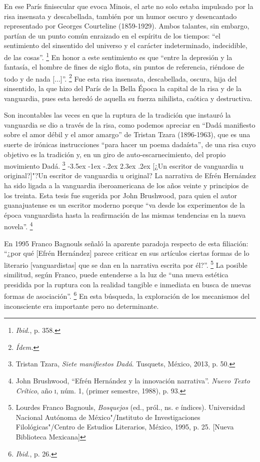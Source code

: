\documentclass[14pt,twoside,final]{extbook} %
\makeatletter
\let\oldfootnote\footnote
\renewcommand\footnote[1]{%
\oldfootnote{\hspace{1mm}#1}}
\renewcommand\section{\@startsection {section}{1}{\z@}%
                                     {-3.5ex \@plus -1ex \@minus -.2ex}%
                                     {2.3ex \@plus .2ex}%
                                     {\normalfont\large\bfseries\sc}}
\makeatother
\begin{document}
En ese París finisecular que evoca Minois, el arte no solo estaba impulsado por la risa insensata y descabellada, también por un humor oscuro y desencantado representado por Georges Courteline (1859-1929). Ambos talantes, sin embargo, partían de un punto común enraizado en el espíritu de los tiempos: ``el sentimiento del sinsentido del universo y el carácter indeterminado, indecidible, de las cosas''.\footnote{\emph{Ibid.}, p. 358.} En honor a este sentimiento es que ``entre la depresión y la fantasía, el hombre de fines de siglo flota, sin puntos de referencia, riéndose de todo y de nada [...]''.\footnote{\em Ídem.} Fue esta risa insensata, descabellada, oscura, hija del sinsentido, la que hizo del París de la Bella Época la capital de la risa y de la vanguardia, pues esta heredó de aquella su fuerza nihilista, caótica y destructiva.

Son incontables las veces en que la ruptura de la tradición que instauró la vanguardia se dio a través de la risa, como podemos apreciar en ``Dadá manifiesto sobre el amor débil y el amor amargo'' de Tristan Tzara (\mbox{1896-1963}), que es una suerte de irónicas instrucciones ``para hacer un poema dadaísta'', de una risa cuyo objetivo es la tradición y, en un giro de auto-escarnecimiento, del propio movimiento Dadá.\footnote{Tristan Tzara, \emph{Siete manifiestos Dadá}. Tusquets, México, 2013, p. 50.}
\section[¿Un escritor de vanguardia u original?]{"?Un escritor de vanguardia u original?}\label{sec:un-escritor-de-vanguardia-u-original}
La narrativa de Efrén Hernández ha sido ligada a la vanguardia iberoamericana de los años veinte y principios de los treinta. Esta tesis fue sugerida por John Brushwood, para quien el autor guanajuatense es un escritor moderno porque ``va desde los experimentos de la época vanguardista hasta la reafirmación de las mismas tendencias en la nueva novela''.\footnote{John Brushwood, ``Efrén Hernández y la innovación narrativa''. \emph{Nuevo Texto Crítico}, año \textsc{i}, núm. 1, (primer semestre, 1988), p. 93.}\protect\enlargethispage*{\baselineskip}

En 1995 Franco Bagnouls señaló la aparente paradoja respecto de esta filiación: ``¿por qué [Efrén Hernández] parece criticar en sus artículos ciertas formas de lo literario [vanguardistas] que se dan en la narrativa escrita por él?''.\footnote{Lourdes Franco Bagnouls, \emph{Bosquejos} (ed., pról., ns. e índices). Universidad Nacional Autónoma de México"/Instituto de Investigaciones Filológicas"/Centro de Estudios Literarios, México, 1995, p. 25. [Nueva Biblioteca Mexicana]} La posible similitud, según Franco, puede entenderse a la luz de ``una nueva estética presidida por la ruptura con la realidad tangible e inmediata en busca de nuevas formas de asociación''.\footnote{\emph{Ibid.}, p. 26.} En esta búsqueda, la exploración de los mecanismos del inconsciente era importante pero no determinante.
\end{document}
